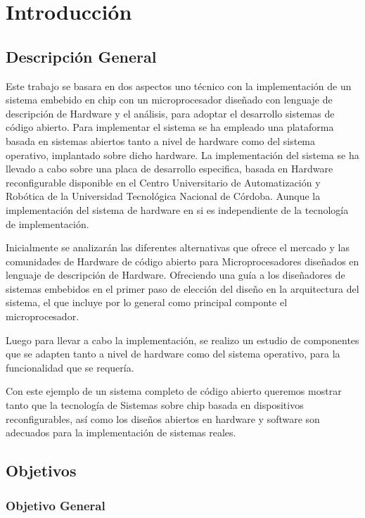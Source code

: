 \chapter{Introducción}

\section{Descripción General}
Este trabajo se basara en dos aspectos uno técnico con la implementación de un sistema embebido en chip con un microprocesador diseñado con lenguaje de descripción de Hardware y el análisis, para adoptar el desarrollo sistemas de código abierto.
Para implementar el sistema se ha empleado una plataforma basada en sistemas 
abiertos tanto a nivel de hardware como del sistema operativo, implantado sobre dicho hardware.
La implementación del sistema se ha llevado a cabo sobre una placa de desarrollo especifica, basada en Hardware reconfigurable disponible en el Centro Universitario de Automatización y Robótica de la Universidad Tecnológica Nacional de Córdoba. Aunque la implementación del sistema de hardware en si es independiente de la tecnología de  implementación.

Inicialmente se analizarán las diferentes alternativas que ofrece el mercado y las comunidades de Hardware de código abierto para Microprocesadores diseñados en lenguaje de descripción de Hardware. Ofreciendo una guía a los diseñadores de sistemas embebidos en el primer paso de elección del diseño en la arquitectura del sistema, el que incluye por lo general como principal componte el microprocesador.

Luego para llevar a cabo la implementación, se realizo un estudio de componentes que se adapten tanto a nivel de hardware como del sistema operativo, para la funcionalidad que se  requería. 

Con este ejemplo de un sistema completo de código abierto queremos mostrar tanto que la tecnología de Sistemas sobre chip basada en dispositivos reconfigurables, así como los diseños abiertos en hardware y software son adecuados 
para la implementación de sistemas reales.

\section{Objetivos}
\subsection{Objetivo General}

